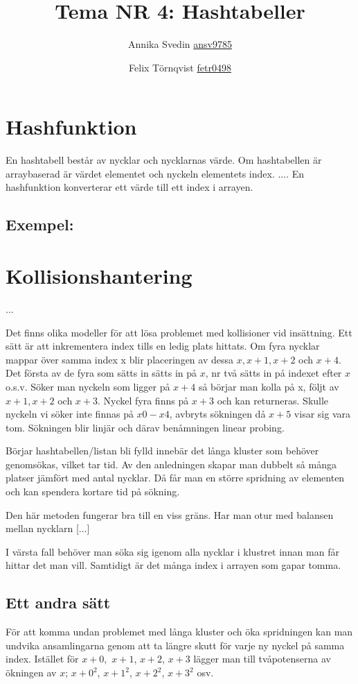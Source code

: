 \documentclass[a5paper,10pt,oneside]{article}
\title{Tema NR 4: Hashtabeller}
\author{Annika Svedin \url{ansv9785} \and Felix Törnqvist \url{fetr0498}}
\begin{document}
\maketitle
\section*{Hashfunktion}




En hashtabell består av nycklar och nycklarnas värde. Om hashtabellen är arraybaserad är värdet elementet och nyckeln elementets index. 
 ....
En hashfunktion konverterar ett värde till ett index i arrayen.

\subsection*{Exempel:}


\section*{Kollisionshantering}
 ...

Det finns olika modeller för att lösa problemet med kollisioner vid insättning.
Ett sätt är att inkrementera index tills en ledig plats hittats.
Om fyra nycklar mappar över samma index x blir placeringen av dessa $x, x+1, x+2$ och $x+4$. Det första av de fyra som sätts in sätts in på $x$, nr två sätts in på indexet efter $x$ o.s.v. 
Söker man nyckeln som ligger på $x + 4$ så börjar man kolla på x, följt av $x + 1, x + 2$ och $x+3$. Nyckel fyra finns på $x + 3$ och kan returneras. Skulle nyckeln vi söker inte finnas på $x0 - x4$, avbryts sökningen då $x + 5$ visar sig vara tom. Sökningen blir linjär och därav benåmningen linear probing.

 Börjar hashtabellen/listan bli fylld innebär det långa kluster som behöver genomsökas, vilket tar tid. Av den anledningen skapar man dubbelt så många platser jämfört med antal nycklar. Då får man en större spridning av elementen och kan spendera kortare tid på sökning.

Den här metoden fungerar bra till en viss gräns. Har man otur med balansen mellan nycklarn [...]



 I värsta fall behöver man söka sig igenom alla nycklar i klustret innan man får hittar det man vill. Samtidigt är det många index i arrayen som gapar tomma. 


\subsection*{Ett andra sätt}
För att komma undan problemet med långa kluster och öka spridningen kan man undvika ansamlingarna genom att ta längre skutt för varje ny nyckel på samma index.
Istället för $ x + 0,$  $x + 1$, $x + 2$, $x + 3$ lägger man till tvåpotenserna av ökningen av $x$;
$ x + {0}^{2} $, $ x + {1}^{2} $, $ x + {2}^{2} $, $ x + {3}^{2} $ osv.
\end{document}
